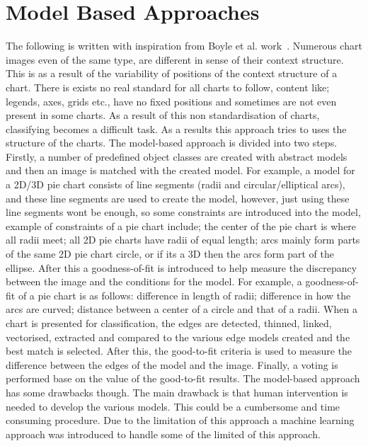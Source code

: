 \documentclass[12pt, a4paper,oneside]{report}
\begin{document}
\section{Model Based Approaches}
The following is written with inspiration from Boyle et al. work~\cite{boyle2007advances}. Numerous chart images even of the same type, are different in sense of their context structure. This is as a result of the variability of positions of the context structure of a chart. There is exists no real standard for all charts to follow, content like; legends, axes, grids etc., have no fixed positions and sometimes are not even present in some charts. As a result of this non standardisation of charts, classifying becomes a difficult task. As a results this approach tries to uses the structure of the charts. The model-based approach is divided into two steps. Firstly, a number of predefined object classes are created with abstract models and then an image is matched with the created model. For example, a model for a 2D/3D pie chart consists of line segments (radii and circular/elliptical arcs), and these line segments are used to create the model, however, just using these line segments wont be enough, so some constraints are introduced into the model, example of constraints of a pie chart include; the center of the pie chart is where all radii meet; all 2D pie charts have radii of equal length; arcs mainly form parts of the same 2D pie chart circle, or if its a 3D then the arcs form part of the ellipse. After this a goodness-of-fit is introduced to help measure the discrepancy between the image and the conditions for the model. For example, a goodness-of-fit of a pie chart is as follows: difference in length of radii; difference in how the arcs are curved; distance between a center of a circle and that of a radii. When a chart is presented for classification, the edges are detected, thinned, linked, vectorised, extracted and compared to the various edge models created and the best match is selected. After this, the good-to-fit criteria is used to measure the difference between the edges of the model and the image. Finally, a voting is performed base on the value of the good-to-fit results. The model-based approach has some drawbacks though. The main drawback is that human intervention is needed to develop the various models. This could be a cumbersome and time consuming procedure. Due to the limitation of this approach a machine learning approach was introduced to handle some of the limited of this approach.
\end{document}
